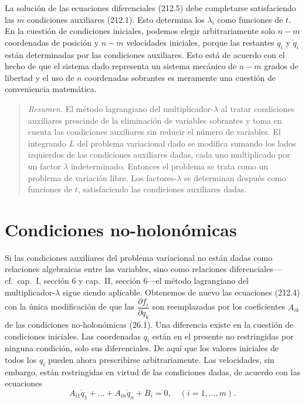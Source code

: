 \documentclass[12pt,a4paper]{book}
\begin{document}
La solución de las ecuaciones diferenciales (212.5) debe completarse satisfaciendo las $m$ condiciones auxiliares (212.1). Esto determina los $\lambda_i$ como funciones de $t$. En la cuestión de condiciones iniciales, podemos elegir arbitrariamente solo $n - m$ coordenadas de posición y $n - m$ velocidades iniciales, porque las restantes $q_i$ y $\dot{q}_i$ están determinadas por las condiciones auxiliares. Esto está de acuerdo con el hecho de que el sistema dado representa un sistema mecánico de $n - m$ grados de libertad y el uso de $n$ coordenadas sobrantes es meramente una cuestión de conveniencia matemática.

\begin{quote}
\textit{Resumen.} El método lagrangiano del multiplicador-$\lambda$ al tratar condiciones auxiliares prescinde de la eliminación de variables sobrantes y toma en cuenta las condiciones auxiliares sin reducir el número de variables. El integrando $L$ del problema variacional dado se modifica sumando los lados izquierdos de las condiciones auxiliares dadas, cada uno multiplicado por un factor $\lambda$ indeterminado. Entonces el problema se trata como un problema de variación libre. Los factores-$\lambda$ se determinan después como funciones de $t$, satisfaciendo las condiciones auxiliares dadas.
\end{quote}

\section{Condiciones no-holonómicas}

Si las condiciones auxiliares del problema variacional no están dadas como relaciones algebraicas entre las variables, sino como relaciones diferenciales---cf.\ cap.\ I, sección 6 y cap.\ II, sección 6---el método lagrangiano del multiplicador-$\lambda$ sigue siendo aplicable. Obtenemos de nuevo las ecuaciones (212.4) con la única modificación de que las $\dfrac{\partial f_i}{\partial q_k}$ son reemplazadas por los coeficientes $A_{ik}$ de las condiciones no-holonómicas (26.1). Una diferencia existe en la cuestión de condiciones iniciales. Las coordenadas $q_i$ están en el presente no restringidas por ninguna condición, solo sus diferenciales. De aquí que los valores iniciales de todos los $q_i$ pueden ahora prescribirse arbitrariamente. Las velocidades, sin embargo, están restringidas en virtud de las condiciones dadas, de acuerdo con las ecuaciones
\begin{equation}
A_{i1}\dot{q}_1 + \ldots + A_{in}\dot{q}_n + B_i = 0, \quad (i = 1, \ldots, m). \tag{213.1}
\end{equation}
\end{document}
